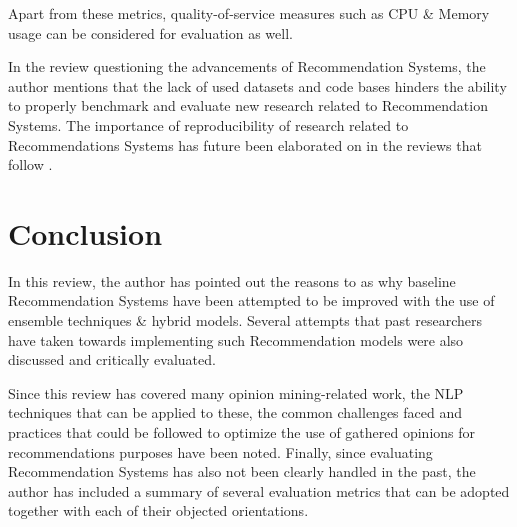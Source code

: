 \documentclass[manuscript,screen,review]{acmart}
\begin{document}
Apart from these metrics, quality-of-service measures such as CPU \& Memory usage can be considered for evaluation as well. 


In the review questioning the advancements of Recommendation Systems, \cite{dacrema_are_2019} the author mentions that the lack of used datasets and code bases hinders the ability to properly benchmark and evaluate new research related to Recommendation Systems. The importance of reproducibility of research related to Recommendations Systems has future been elaborated on in the reviews that follow \cite{dacrema_troubling_2021, ferrari_dacrema_critically_2020, dacrema_methodological_2020}.


\section{Conclusion}
In this review, the author has pointed out the reasons to as why baseline Recommendation Systems have been attempted to be improved with the use of ensemble techniques \& hybrid models. Several attempts that past researchers have taken towards implementing such Recommendation models were also discussed and critically evaluated.

Since this review has covered many opinion mining-related work, the NLP techniques that can be applied to these, the common challenges faced and practices that could be followed to optimize the use of gathered opinions for recommendations purposes have been noted. Finally, since evaluating Recommendation Systems has also not been clearly handled in the past, the author has included a summary of several evaluation metrics that can be adopted together with each of their objected orientations.



\end{document}
